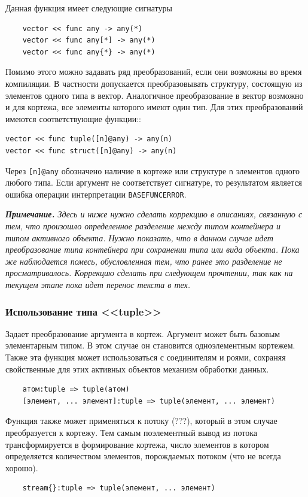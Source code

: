 Данная функция имеет следующие сигнатуры
\begin{verbatim}
    vector << func any -> any(*)
    vector << func any[*] -> any(*)
    vector << func any{*} -> any(*)
\end{verbatim}

Помимо этого можно задавать ряд преобразований, если они возможны во время компиляции. В частности допускается преобразовывать структуру, состоящую из элементов одного типа в вектор. Аналогичное преобразование в вектор возможно и для кортежа, все элементы которого имеют один тип. Для этих преобразований имеются соответствующие функции::
\begin{verbatim}
vector << func tuple([n]@any) -> any(n)
vector << func struct([n]@any) -> any(n)
\end{verbatim}

Через \verb|[n]@any| обозначено наличие в кортеже или структуре \verb|n| элементов одного любого типа. Если аргумент не соответствует сигнатуре, то результатом является ошибка операции интерпретации \verb|BASEFUNCERROR|.

\textit{\textbf{Примечание.}
Здесь и ниже нужно сделать коррекцию в описаниях, связанную с тем, что произошло определенное разделение между типом контейнера и типом активного объекта. Нужно показать, что в данном случае идет преобразование типа контейнера при сохранении типа или вида объекта. Пока же наблюдается помесь, обусловленная тем, что ранее это разделение не просматривалось. Коррекцию сделать при следующем прочтении, так как на текущем этапе пока идет перенос текста в тех.}

\subsubsection{Использование типа <<tuple>>}

Задает преобразование аргумента в кортеж. Аргумент может быть базовым элементарным типом. В этом случае он становится одноэлементным кортежем. Также эта функция может использоваться с соединителям и роями, сохраняя свойственные для этих активных объектов механизм обработки данных.
\begin{verbatim}
    атом:tuple => tuple(атом)
    [элемент, ... элемент]:tuple => tuple(элемент, ... элемент)
\end{verbatim}

Функция также может применяться к потоку (???), который в этом случае преобразуется к кортежу. Тем самым поэлементный вывод из потока трансформируется в формирование кортежа, число элементов в котором определяется количеством элементов, порождаемых потоком (что не всегда хорошо).
\begin{verbatim}
    stream{}:tuple => tuple(элемент, ... элемент)
\end{verbatim}


